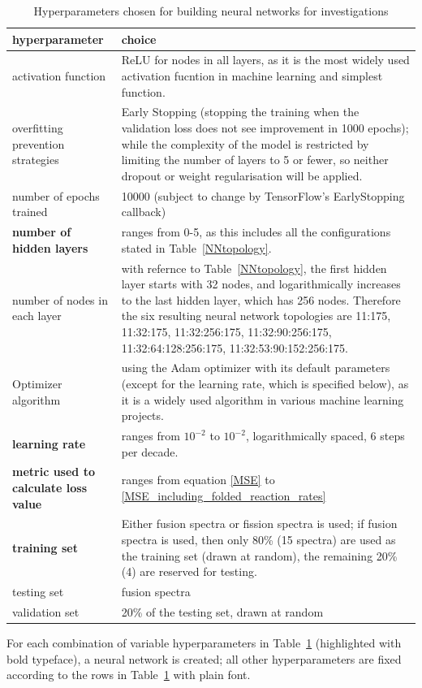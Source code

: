\documentclass[a4paper, 12pt]{article}
\begin{document}
\begin{table}[H]
\begin{tabularx}{\textwidth}{lX}
hyperparameter & choice  \\
\hline
activation function & ReLU\cite{ReLU} for nodes in all layers, as it is the most widely used activation fucntion in machine learning and simplest function. \\
overfitting prevention strategies & Early Stopping (stopping the training when the validation loss does not see improvement in 1000 epochs); while the complexity of the model is restricted by limiting the number of layers to 5 or fewer, so neither dropout or weight regularisation will be applied. \\
number of epochs trained & 10000 (subject to change by TensorFlow's EarlyStopping callback) \\
\textbf{number of hidden layers} & ranges from 0-5, as this includes all the configurations stated in Table~\ref{NNtopology}. \\
number of nodes in each layer & with refernce to Table~\ref{NNtopology}, the first hidden layer starts with 32 nodes, and logarithmically increases to the last hidden layer, which has 256 nodes. Therefore the six resulting neural network topologies are 11:175, 11:32:175, 11:32:256:175, 11:32:90:256:175, 11:32:64:128:256:175, 11:32:53:90:152:256:175.\\
Optimizer algorithm & using the Adam optimizer\cite{AdamOptimizer} with its default parameters (except for the learning rate, which is specified below), as it is a widely used algorithm in various machine learning projects.\\
\textbf{learning rate} & ranges from $10^{-2}$ to $10^{-2}$, logarithmically spaced, 6 steps per decade.\\
\textbf{metric used to calculate loss value} & ranges from equation \ref{MSE} to \ref{MSE_including_folded_reaction_rates}\\
\textbf{training set} & Either fusion spectra or fission spectra is used; if fusion spectra is used, then only 80\% (15 spectra) are used as the training set (drawn at random), the remaining 20\%(4) are reserved for testing. \\
testing set & fusion spectra\\
validation set & 20\% of the testing set, drawn at random
\end{tabularx}
\caption{Hyperparameters chosen for building neural networks for investigations}\label{HyperparameterRange}
\end{table}
For each combination of variable hyperparameters in Table~\ref{HyperparameterRange} (highlighted with bold typeface), a neural network is created; all other hyperparameters are fixed according to the rows in Table~\ref{HyperparameterRange} with plain font.
\end{document}
